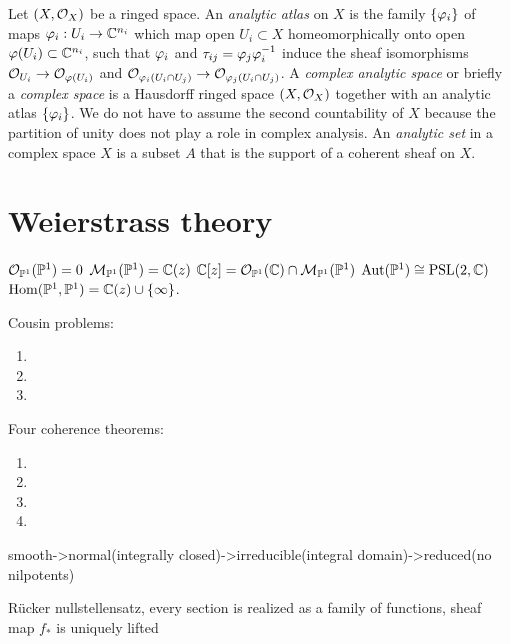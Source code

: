 \documentclass{../../large}
\begin{document}
\begin{prb}
Let $(X,\mathcal{O}_X)$ be a ringed space.
An \emph{analytic atlas} on $X$ is the family $\{\varphi_i\}$ of maps $\varphi_i:U_i\to\mathbb{C}^{n_i}$ which map open $U_i\subset X$ homeomorphically onto open $\varphi(U_i)\subset\mathbb{C}^{n_i}$, such that $\varphi_i$ and $\tau_{ij}=\varphi_j\varphi_i^{-1}$ induce the sheaf isomorphisms $\mathcal{O}_{U_i}\to\mathcal{O}_{\varphi(U_i)}$ and $\mathcal{O}_{\varphi_i(U_i\cap U_j)}\to\mathcal{O}_{\varphi_j(U_i\cap U_j)}$.
A \emph{complex analytic space} or briefly a \emph{complex space} is a Hausdorff ringed space $(X,\mathcal{O}_X)$ together with an analytic atlas $\{\varphi_i\}$.
We do not have to assume the second countability of $X$ because the partition of unity does not play a role in complex analysis.
An \emph{analytic set} in a complex space $X$ is a subset $A$ that is the support of a coherent sheaf on $X$.
\end{prb}




\section{Weierstrass theory}

$\mathcal{O}_{\mathbb{P}^1}(\mathbb{P}^1)=0$
$\mathcal{M}_{\mathbb{P}^1}(\mathbb{P}^1)=\mathbb{C}(z)$
$\mathbb{C}[z]=\mathcal{O}_{\mathbb{P}^1}(\mathbb{C})\cap\mathcal{M}_{\mathbb{P}^1}(\mathbb{P}^1)$
$\operatorname{Aut}(\mathbb{P}^1)\cong\mathrm{PSL}(2,\mathbb{C})$
$\operatorname{Hom}(\mathbb{P}^1,\mathbb{P}^1)=\mathbb{C}(z)\cup\{\infty\}$.


Cousin problems:
\begin{enumerate}
\item 
\item
\item
\end{enumerate}

Four coherence theorems:
\begin{enumerate}
\item 
\item
\item
\item
\end{enumerate}

\begin{prb}
smooth->normal(integrally closed)->irreducible(integral domain)->reduced(no nilpotents)
\end{prb}

\begin{prb}
R\"ucker nullstellensatz,
every section is realized as a family of functions,
sheaf map $f_*$ is uniquely lifted
\end{prb}
\end{document}
